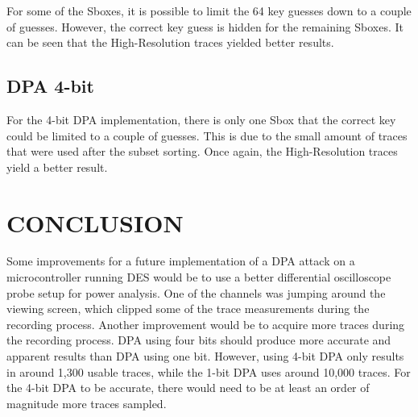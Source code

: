 \documentclass[letterpaper, 10 pt, conference]{ieeeconf}  %
\begin{document}
For some of the Sboxes, it is possible to limit the 64 key guesses down to a couple of guesses.  However, the correct key guess is hidden for the remaining Sboxes.  It can be seen that the High-Resolution traces yielded better results. 

\subsection{DPA 4-bit}

For the 4-bit DPA implementation, there is only one Sbox that the correct key could be limited to a couple of guesses.  This is due to the small amount of traces that were used after the subset sorting.  Once again, the High-Resolution traces yield a better result.


\section{CONCLUSION}

Some improvements for a future implementation of a DPA attack on a microcontroller running DES would be to use a better differential oscilloscope probe setup for power analysis. One of the channels was jumping around the viewing screen, which clipped some of the trace measurements during the recording process. Another improvement would be to acquire more traces during the recording process. DPA using four bits should produce more accurate and apparent results than DPA using one bit. However, using 4-bit DPA only results
in around 1,300 usable traces, while the 1-bit DPA uses around 10,000 traces. For the 4-bit DPA to be accurate, there would need to be at least an order of magnitude more traces sampled.


\addtolength{\textheight}{-12cm}   %




\end{document}
